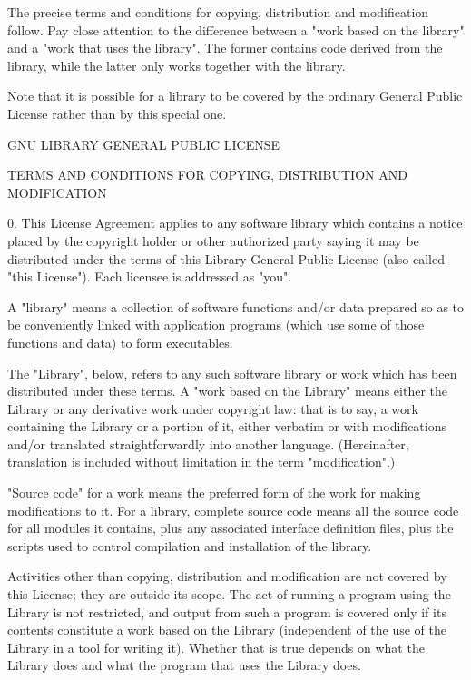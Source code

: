 \documentclass[twoside]{tceusermanual}
\begin{document}
The precise terms and conditions for copying, distribution and
modification follow.  Pay close attention to the difference
between a "work based on the library" and a "work that uses the
library".  The former contains code derived from the library,
while the latter only works together with the library.

Note that it is possible for a library to be covered by the
ordinary General Public License rather than by this special one.

\begin{center}
                GNU LIBRARY GENERAL PUBLIC LICENSE

 TERMS AND CONDITIONS FOR COPYING, DISTRIBUTION AND MODIFICATION
\end{center}

0. This License Agreement applies to any software library which
contains a notice placed by the copyright holder or other
authorized party saying it may be distributed under the terms of
this Library General Public License (also called "this
License").  Each licensee is addressed as "you".

A "library" means a collection of software functions and/or data
prepared so as to be conveniently linked with application
programs (which use some of those functions and data) to form
executables.

The "Library", below, refers to any such software library or
work which has been distributed under these terms.  A "work
based on the Library" means either the Library or any derivative
work under copyright law: that is to say, a work containing the
Library or a portion of it, either verbatim or with
modifications and/or translated straightforwardly into another
language.  (Hereinafter, translation is included without
limitation in the term "modification".)

"Source code" for a work means the preferred form of the work
for making modifications to it.  For a library, complete source
code means all the source code for all modules it contains, plus
any associated interface definition files, plus the scripts used
to control compilation and installation of the library.

Activities other than copying, distribution and modification are
not covered by this License; they are outside its scope.  The
act of running a program using the Library is not restricted,
and output from such a program is covered only if its contents
constitute a work based on the Library (independent of the use
of the Library in a tool for writing it).  Whether that is true
depends on what the Library does and what the program that uses
the Library does.
  
\end{document}
